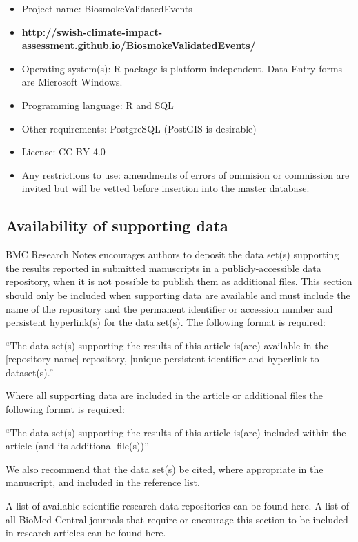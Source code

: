 \begin{itemize}
\itemsep1pt\parskip0pt
\item
  Project name: BiosmokeValidatedEvents
\item
  \textbf{http://swish-climate-impact-assessment.github.io/BiosmokeValidatedEvents/}
\item
  Operating system(s): R package is platform independent. Data Entry
  forms are Microsoft Windows.
\item
  Programming language: R and SQL
\item
  Other requirements: PostgreSQL (PostGIS is desirable)
\item
  License: CC BY 4.0
\item
  Any restrictions to use: amendments of errors of ommision or
  commission are invited but will be vetted before insertion into the
  master database.
\end{itemize}

\subsection{Availability of supporting
data}\label{availability-of-supporting-data}

BMC Research Notes encourages authors to deposit the data set(s)
supporting the results reported in submitted manuscripts in a
publicly-accessible data repository, when it is not possible to publish
them as additional files. This section should only be included when
supporting data are available and must include the name of the
repository and the permanent identifier or accession number and
persistent hyperlink(s) for the data set(s). The following format is
required:

``The data set(s) supporting the results of this article is(are)
available in the {[}repository name{]} repository, {[}unique persistent
identifier and hyperlink to dataset(s).''

Where all supporting data are included in the article or additional
files the following format is required:

``The data set(s) supporting the results of this article is(are)
included within the article (and its additional file(s))''

We also recommend that the data set(s) be cited, where appropriate in
the manuscript, and included in the reference list.

A list of available scientific research data repositories can be found
here. A list of all BioMed Central journals that require or encourage
this section to be included in research articles can be found here.


